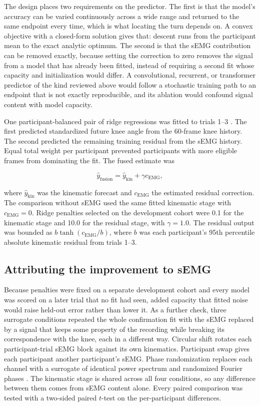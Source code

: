 \documentclass[referee,lineno,pdflatex,sn-vancouver-num]{sn-jnl}
\begin{document}
The design places two requirements on the predictor. The first is that the model's accuracy can be varied
continuously across a wide range and returned to the same endpoint every time,
which is what locating the turn depends on. A convex objective with a closed-form
solution gives that: descent runs from the participant mean to the exact analytic
optimum. The second is that the sEMG contribution can be removed exactly, because setting the correction to zero removes the signal
from a model that has already been fitted, instead of requiring a second fit whose
capacity and initialization would differ. A convolutional, recurrent, or
transformer predictor of the kind reviewed above would follow a stochastic
training path to an endpoint that is not exactly reproducible, and its ablation
would confound signal content with model capacity.

One participant-balanced pair of ridge regressions was fitted to trials 1--3
\cite{hoerl1970}. The first predicted standardized future knee angle from the
60-frame knee history. The second predicted the remaining training residual from
the sEMG history. Equal total weight per participant prevented participants with
more eligible frames from dominating the fit. The fused estimate was

\begin{equation}
\hat y_{\mathrm{fusion}}=\hat y_{\mathrm{kin}}+\gamma c_{\mathrm{EMG}},
\label{eq:fusion}
\end{equation}

where $\hat y_{\mathrm{kin}}$ was the kinematic forecast and $c_{\mathrm{EMG}}$ the
estimated residual correction. The comparison without sEMG used the same fitted
kinematic stage with $c_{\mathrm{EMG}}=0$. Ridge penalties selected on the
development cohort were 0.1 for the kinematic stage
and 10.0 for the residual stage, with
$\gamma=1.0$. The residual output was bounded as
$b\tanh(c_{\mathrm{EMG}}/b)$, where $b$ was each participant's 95th percentile
absolute kinematic residual from trials 1--3.

\subsection{Attributing the improvement to sEMG}

Because penalties were fixed on a separate development cohort and every model was
scored on a later trial that no fit had seen, added capacity that
fitted noise would raise held-out error rather than lower it. As a
further check, three surrogate conditions repeated the whole confirmation fit with
the sEMG replaced by a signal that keeps some property of the recording while
breaking its correspondence with the knee, each in a different way. Circular shift rotates each participant-trial sEMG block against
its own kinematics. Participant swap gives each participant another
participant's sEMG. Phase randomization replaces each channel with a surrogate
of identical power spectrum and randomized Fourier phases
\cite{theiler1992}. The kinematic stage is shared across all four conditions,
so any difference between them comes from sEMG content alone. Every paired
comparison was tested with a two-sided paired $t$-test on the per-participant
differences.
\end{document}
